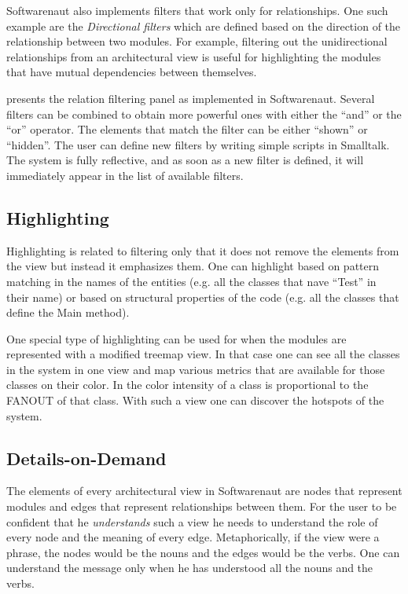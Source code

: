 \documentclass[preprint,12pt]{elsarticle}
\begin{document}
Softwarenaut also implements filters that work only for relationships. One such example are the {\em Directional filters} which are defined based on the direction of the relationship between two modules. For example, filtering out the unidirectional relationships from an architectural view is useful for highlighting the modules that have mutual dependencies between themselves. 

 presents the relation filtering panel as implemented in Softwarenaut. Several filters can be combined to obtain more powerful ones with either the ``and'' or the ``or'' operator. The elements that match the filter can be either ``shown'' or ``hidden''. The user can define new filters by writing simple scripts in Smalltalk. The system is fully reflective, and as soon as a new filter is defined, it will immediately appear in the list of available filters.


\subsection {Highlighting}
Highlighting is related to filtering only that it does not remove the elements from the view but instead it emphasizes them. One can highlight based on pattern matching in the names of the entities (e.g. all the classes that nave ``Test'' in their name) or based on structural properties of the code (e.g. all the classes that define the Main method). 

One special type of highlighting can be used for when the modules are represented with a modified treemap view. In that case one can see all the classes in the system in one view and map various metrics that are available for those classes on their color. In  the color intensity of a class is proportional to the FANOUT of that class. With such a view one can discover the hotspots of the system. %

\subsection {Details-on-Demand} 

The elements of every architectural view in Softwarenaut are nodes that represent modules and edges that represent relationships between them. For the user to be confident that he {\em understands} such a view he needs to understand the role of every node and the meaning of every edge. Metaphorically, if the view were a phrase, the nodes would be the nouns and the edges would be the verbs. One can understand the message only when he has understood all the nouns and the verbs.
\end{document}
